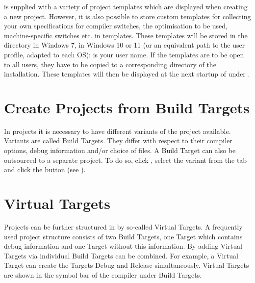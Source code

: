 \codeblocks is supplied with a variety of project templates which are displayed when creating a new project. However, it is also possible to store custom templates for collecting your own specifications for compiler switches, the optimisation to be used, machine-specific switches etc. in templates. These templates will be stored in the  directory in Windows 7,  in Windows 10 or 11 (or an equivalent path to the user profile, adapted to each OS):  is your user name. If the templates are to be open to all users, they have to be copied to a corresponding directory of the \codeblocks installation. These templates will then be displayed at the next startup of \codeblocks under .


\section{Create Projects from Build Targets}

In projects it is necessary to have different variants of the project available. Variants are called Build Targets. They differ with respect to their compiler options, debug information and/or choice of files. A Build Target can also be outsourced to a separate project. To do so, click , select the variant from the tab  and click the  button (see ).


\section{Virtual Targets}

Projects can be further structured in \codeblocks by so-called Virtual Targets. A frequently used project structure consists of two Build Targets, one  Target which contains debug information and one  Target without this information. By adding Virtual Targets via  individual Build Targets can be combined. For example, a Virtual Target  can create the Targets Debug and Release simultaneously. Virtual Targets are shown in the symbol bar of the compiler under Build Targets.

